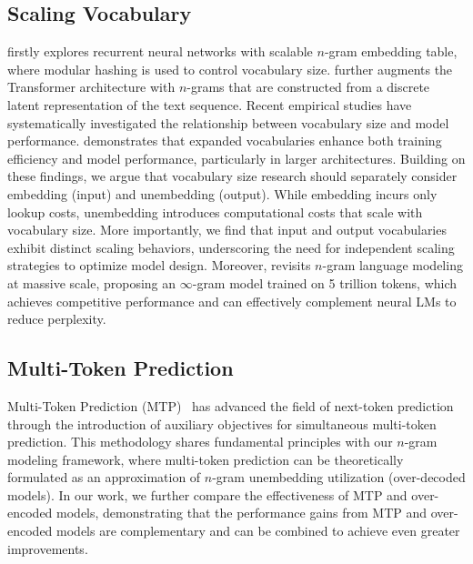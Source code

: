 \subsection{Scaling Vocabulary}
\citet{huang21f_interspeech} firstly explores recurrent neural networks with scalable $n$-gram embedding table, where modular hashing is used to control vocabulary size. \citet{roy2022ngrammeraugmentingtransformerslatent} further augments the Transformer architecture with $n$-grams that are constructed from a discrete latent representation of the text sequence. Recent empirical studies have systematically investigated the relationship between vocabulary size and model performance. \citet{tao2024scaling} demonstrates that expanded vocabularies enhance both training efficiency and model performance, particularly in larger architectures. Building on these findings, we argue that vocabulary size research should separately consider embedding (input) and unembedding (output). While embedding incurs only lookup costs, unembedding introduces computational costs that scale with vocabulary size. More importantly, we find that input and output vocabularies exhibit distinct scaling behaviors, underscoring the need for independent scaling strategies to optimize model design. Moreover, \citet{liu2024infinigram} revisits $n$-gram language modeling at massive scale, proposing an $\infty$-gram model trained on 5 trillion tokens, which achieves competitive performance and can effectively complement neural LMs to reduce perplexity.

\subsection{Multi-Token Prediction}
Multi-Token Prediction (MTP)~\cite{stern2018blockwise,qi2020prophetnet,gloeckle2024better} has advanced the field of next-token prediction through the introduction of auxiliary objectives for simultaneous multi-token prediction. This methodology shares fundamental principles with our $n$-gram modeling framework, where multi-token prediction can be theoretically formulated as an approximation of $n$-gram unembedding utilization (over-decoded models). In our work, we further compare the effectiveness of MTP and over-encoded models, demonstrating that the performance gains from MTP and over-encoded models are complementary and can be combined to achieve even greater improvements. 
